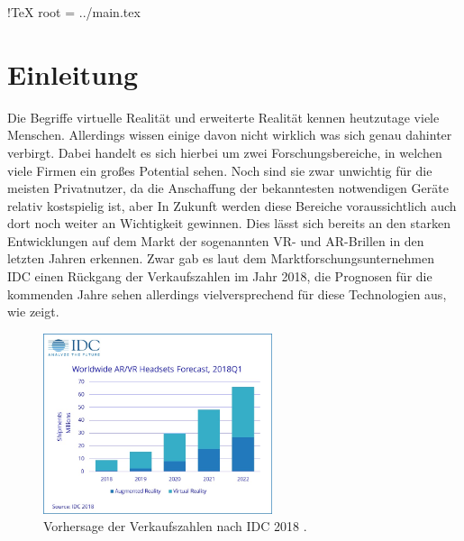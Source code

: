  !TeX root = ../main.tex

\chapter{Einleitung}\label{chapter:introduction}

	
	
	Die Begriffe virtuelle Realität und erweiterte Realität kennen heutzutage viele Menschen. Allerdings wissen einige davon nicht wirklich was sich genau dahinter verbirgt. Dabei handelt es sich hierbei um zwei Forschungsbereiche, in welchen viele Firmen ein großes Potential sehen. Noch sind sie zwar unwichtig für die meisten Privatnutzer, da die Anschaffung der bekanntesten notwendigen Geräte relativ kostspielig ist, aber In Zukunft werden diese Bereiche voraussichtlich auch dort noch weiter an Wichtigkeit gewinnen.
	Dies lässt sich bereits an den starken Entwicklungen auf dem Markt der sogenannten VR- und AR-Brillen in den letzten Jahren erkennen.
	Zwar gab es laut dem Marktforschungsunternehmen IDC einen Rückgang der Verkaufszahlen im Jahr 2018, die Prognosen für die kommenden Jahre sehen allerdings vielversprechend für diese Technologien aus, wie  zeigt.
	
	\begin{figure}[htbp]
		\centering
		\includegraphics[width=0.6\textwidth]{figures/IDC-2018.jpg}
		\caption{Vorhersage der Verkaufszahlen nach IDC 2018 .}
		\label{fig:forecast_diagram}
	\end{figure}
	
